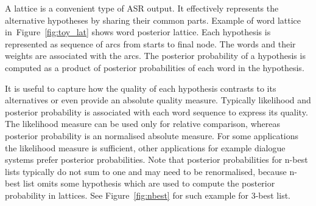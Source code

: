 A lattice is a convenient type of \ac{ASR} output.  
It effectively represents the alternative hypotheses by sharing their common parts.
Example of word lattice in~Figure~\ref{fig:toy_lat} shows word posterior lattice.
Each hypothesis is represented as sequence of arcs from starts to final node.
The words and their weights are associated with the arcs.
The posterior probability of a hypothesis is computed as a product of posterior probabilities of each word in the hypothesis.

It is useful to capture how the quality of each hypothesis contrasts to its alternatives or even provide an absolute quality measure. 
Typically likelihood and posterior probability is associated with each word sequence to express its quality.
The likelihood measure can be used only for relative comparison, whereas posterior probability is an normalised absolute measure.
For some applications the likelihood measure is sufficient, other applications for example dialogue systems prefer posterior probabilities.
Note that posterior probabilities for n-best lists typically do not sum to one and may need to be renormalised, because n-best list omits some hypothesis which are used to compute the posterior probability in lattices. See Figure~\ref{fig:nbest} for such example for 3-best list.

